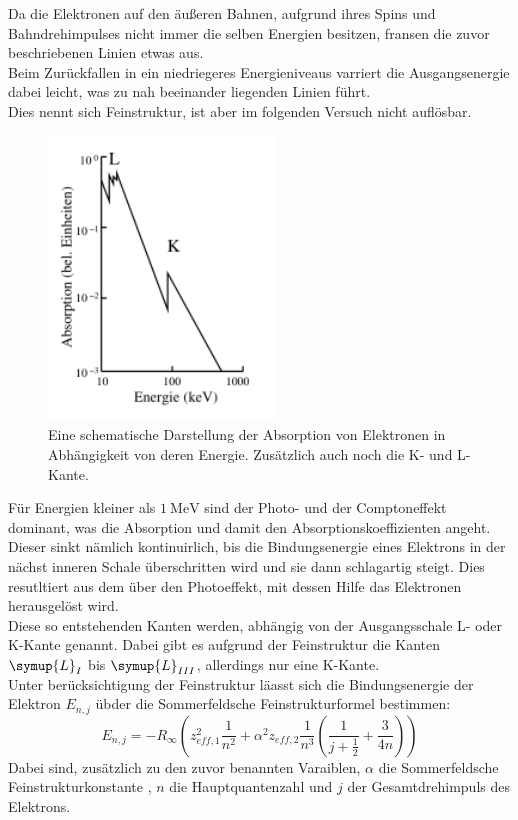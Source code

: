 \noindent Da die Elektronen auf den äußeren Bahnen, aufgrund ihres Spins und Bahndrehimpulses nicht immer die selben Energien besitzen, fransen die zuvor beschriebenen Linien etwas aus.\\
Beim Zurückfallen in ein niedriegeres Energieniveaus varriert die Ausgangsenergie dabei leicht, was zu nah beeinander liegenden Linien führt.\\
Dies nennt sich Feinstruktur, ist aber im folgenden Versuch nicht auflösbar.\\
\begin{figure}
    \centering
    \includegraphics[width=6cm]{latex/images/absorption.PNG}
    \caption{Eine schematische Darstellung der Absorption von Elektronen in Abhängigkeit von deren Energie. Zusätzlich auch noch die K- und L-Kante\protect \cite{V602}.}
    \label{img:comp}
\end{figure}
Für Energien kleiner als $\SI{1}{\mega\eV}$ sind der Photo- und der Comptoneffekt dominant, was die Absorption und damit den Absorptionskoeffizienten angeht.
Dieser sinkt nämlich kontinuirlich, bis die Bindungsenergie eines Elektrons in der nächst inneren Schale überschritten wird und sie dann schlagartig steigt.
Dies resutltiert aus dem über den Photoeffekt, mit dessen Hilfe das Elektronen herausgelöst wird.\\ 
Diese so entstehenden Kanten werden, abhängig von der Ausgangsschale L- oder K-Kante genannt. Dabei gibt es aufgrund der Feinstruktur die Kanten $\symup{L}_{I}$ bis $\symup{L}_{III}$, allerdings nur eine K-Kante.\\
Unter berücksichtigung der Feinstruktur läasst sich die Bindungsenergie der Elektron $E_{n,j}$ übder die Sommerfeldsche Feinstrukturformel bestimmen:
\begin{equation*}
    E_{n,j}= -R_\infty \left( z_{eff,1}^2 \frac{1}{n^2}+ \alpha^2   z_{eff,2}\frac{1}{n^3} \left( \frac{1}{j+ \frac{1}{2}} + \frac{3}{4n}   \right)   \right)
\end{equation*}
Dabei sind, zusätzlich zu den zuvor benannten Varaiblen, $\alpha$ die Sommerfeldsche Feinstrukturkonstante \cite{sommer}, $n$ die Hauptquantenzahl und $j$ der Gesamtdrehimpuls des Elektrons.\\


